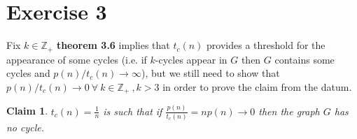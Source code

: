 \documentclass[11pt]{article}
\newtheorem{claim}{Claim}[section]
\begin{document}
\newpage

\section*{Exercise 3}

Fix $k\in \mathbb{Z}_+$ \textbf{theorem 3.6} implies that $t_c(n)$ provides a threshold for the appearance of some cycles (i.e. if $k$-cycles appear in $G$ then $G$ contains some cycles and ${p(n)}/{t_c(n)} \rightarrow \infty$), but we still need to show that ${p(n)}/{t_c(n)} \rightarrow 0 ~ \forall ~k \in \mathbb{Z}_+ ~, k > 3$ in order to prove the claim from the datum.

\begin{claim}
    $t_c(n) = \frac{1}{n}$ is such that if $\frac{p(n)}{t_c(n)} = np(n) \rightarrow 0$ then the graph $G$ has no cycle.
\end{claim}
\end{document}
